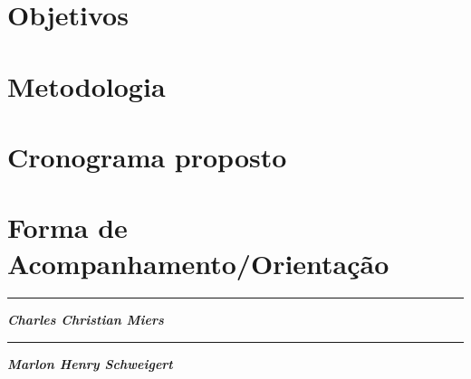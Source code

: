 \documentclass[11pt]{article}
\begin{document}


\section{Objetivos}
\label{obj}

\section{Metodologia}
\label{met}

\section{Cronograma proposto}
\label{cro}

\section{Forma de Acompanhamento/Orientação}




\vskip 1.5cm

\begin{minipage} {0.49\linewidth}
  \centering
  \rule{7.2cm}{0.1mm}

  \textbf{\textit{Charles Christian Miers}}
\end{minipage}
\begin{minipage} {0.49\linewidth}
  \centering
  \rule{7.2cm}{0.1mm}

  \textbf{\textit{Marlon Henry Schweigert}}
\end{minipage}
\end{document}
